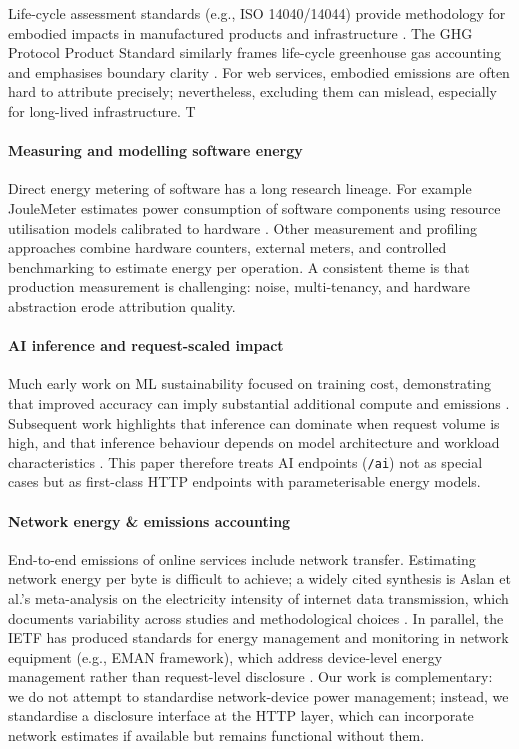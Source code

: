 Life-cycle assessment standards (e.g., ISO 14040/14044) provide methodology for embodied impacts in manufactured products and infrastructure \cite{iso14040,iso14044}. The GHG Protocol Product Standard similarly frames life-cycle greenhouse gas accounting and emphasises boundary clarity \cite{ghgproduct}. For web services, embodied emissions are often hard to attribute precisely; nevertheless, excluding them can mislead, especially for long-lived infrastructure. T

\paragraph{Measuring and modelling software energy}
Direct energy metering of software has a long research lineage. For example JouleMeter estimates power consumption of software components using resource utilisation models calibrated to hardware \cite{kansal2010joulemeter}. Other measurement and profiling approaches combine hardware counters, external meters, and controlled benchmarking to estimate energy per operation. A consistent theme is that production measurement is challenging: noise, multi-tenancy, and hardware abstraction erode attribution quality.

\paragraph{AI inference and request-scaled impact}
Much early work on ML sustainability focused on training cost, demonstrating that improved accuracy can imply substantial additional compute and emissions \cite{strubell2019energy}. Subsequent work highlights that inference can dominate when request volume is high, and that inference behaviour depends on model architecture and workload characteristics \cite{patterson2021carbon,hoffmannmajuntke2024hotcarbon}. This paper therefore treats AI endpoints (\texttt{/ai}) not as special cases but as first-class HTTP endpoints with parameterisable energy models.

\paragraph{Network energy \& emissions accounting}
End-to-end emissions of online services include network transfer. Estimating network energy per byte is difficult to achieve; a widely cited synthesis is Aslan et al.'s meta-analysis on the electricity intensity of internet data transmission, which documents variability across studies and methodological choices \cite{aslan2018internet}. In parallel, the IETF has produced standards for energy management and monitoring in network equipment (e.g., EMAN framework), which address device-level energy management rather than request-level disclosure \cite{rfc7326}. Our work is complementary: we do not attempt to standardise network-device power management; instead, we standardise a disclosure interface at the HTTP layer, which can incorporate network estimates if available but remains functional without them.

